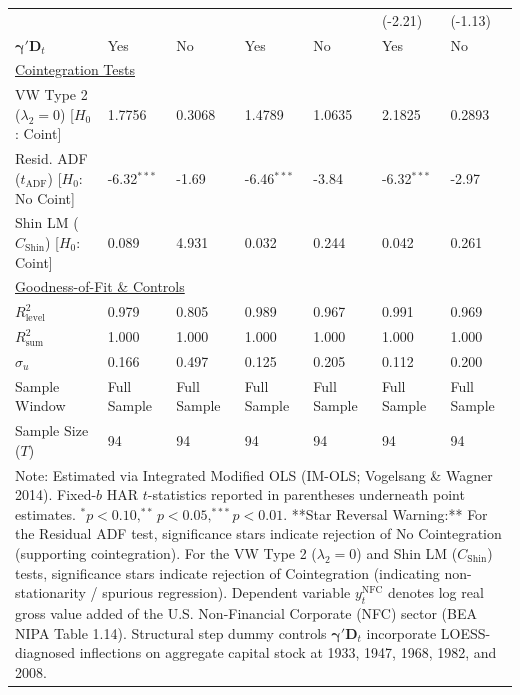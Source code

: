 \begin{landscape}
\begin{table}[H]
\begin{tabular}{p{5.0cm}p{1.8cm}p{1.8cm}p{1.8cm}p{1.8cm}p{1.8cm}p{1.8cm}}
 &  &  &  &  & {\scriptsize (-2.21)} & {\scriptsize (-1.13)}  \\
$\boldsymbol{\gamma}' \mathbf{D}_t$ & Yes & No & Yes & No & Yes & No  \\
\midrule
\multicolumn{7}{l}{\underline{Cointegration Tests}} \\
VW Type 2 ($\lambda_2 = 0$) [$H_0$: Coint] & 1.7756 & 0.3068 & 1.4789 & 1.0635 & 2.1825 & 0.2893  \\
Resid. ADF ($t_{\text{ADF}}$) [$H_0$: No Coint] & -6.32$^{***}$ & -1.69 & -6.46$^{***}$ & -3.84 & -6.32$^{***}$ & -2.97  \\
Shin LM ($C_{\text{Shin}}$) [$H_0$: Coint] & 0.089 & 4.931 & 0.032 & 0.244 & 0.042 & 0.261  \\
\midrule
\multicolumn{7}{l}{\underline{Goodness-of-Fit \& Controls}} \\
$R_{\text{level}}^2$ & 0.979 & 0.805 & 0.989 & 0.967 & 0.991 & 0.969  \\
$R_{\text{sum}}^2$ & 1.000 & 1.000 & 1.000 & 1.000 & 1.000 & 1.000  \\
$\hat{\sigma}_u$ & 0.166 & 0.497 & 0.125 & 0.205 & 0.112 & 0.200  \\
Sample Window & Full Sample & Full Sample & Full Sample & Full Sample & Full Sample & Full Sample  \\
Sample Size ($T$) & 94 & 94 & 94 & 94 & 94 & 94  \\
\bottomrule
\multicolumn{7}{p{19.5cm}}{\footnotesize Note: Estimated via Integrated Modified OLS (IM-OLS; Vogelsang \& Wagner 2014). Fixed-$b$ HAR $t$-statistics reported in parentheses underneath point estimates. $^*p<0.10, ^{**}p<0.05, ^{***}p<0.01$. **Star Reversal Warning:** For the Residual ADF test, significance stars indicate rejection of No Cointegration (supporting cointegration). For the VW Type 2 ($\lambda_2 = 0$) and Shin LM ($C_{\text{Shin}}$) tests, significance stars indicate rejection of Cointegration (indicating non-stationarity / spurious regression). Dependent variable $y_t^{\text{NFC}}$ denotes log real gross value added of the U.S. Non-Financial Corporate (NFC) sector (BEA NIPA Table 1.14). Structural step dummy controls $\boldsymbol{\gamma}' \mathbf{D}_t$ incorporate LOESS-diagnosed inflections on aggregate capital stock at 1933, 1947, 1968, 1982, and 2008.}
\end{tabular}
\end{table}
\end{landscape}
